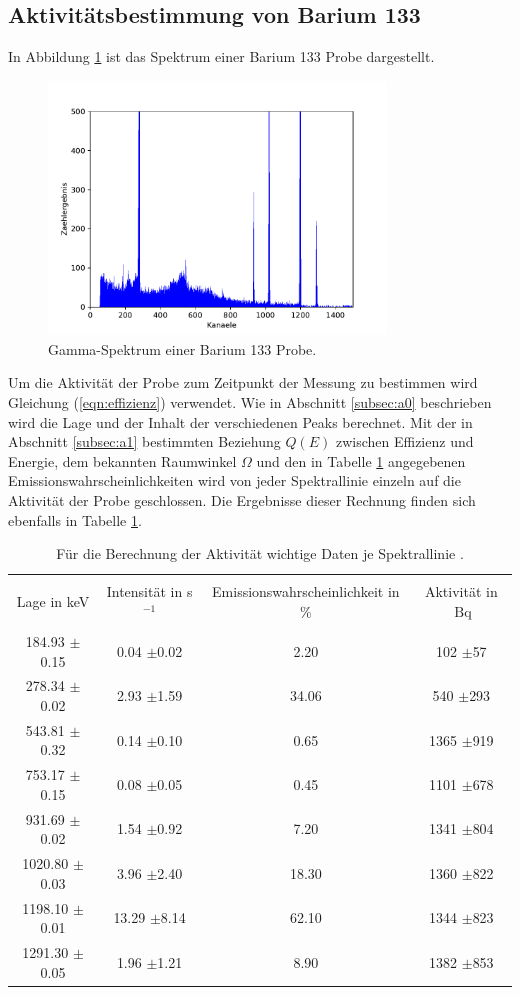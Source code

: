 \subsection{Aktivitätsbestimmung von Barium 133}
\label{subsec:a3}
In Abbildung \ref{fig:Spektrum_Barium} ist das Spektrum einer Barium 133 Probe dargestellt.
\begin{figure}
\centering
\includegraphics[width=0.8\textwidth]{python/plots/spec3.pdf}
\caption{Gamma-Spektrum einer Barium 133 Probe.}
\label{fig:Spektrum_Barium}
\end{figure}
Um die Aktivität der Probe zum Zeitpunkt der Messung zu bestimmen wird Gleichung (\ref{eqn:effizienz}) verwendet.
Wie in Abschnitt \ref{subsec:a0} beschrieben wird die Lage und der Inhalt der verschiedenen Peaks berechnet.
Mit der in Abschnitt \ref{subsec:a1} bestimmten Beziehung $Q(E)$ zwischen Effizienz und Energie, dem bekannten Raumwinkel $\Omega$ und den in Tabelle \ref{tab:a_d_1} angegebenen Emissionswahrscheinlichkeiten wird von jeder Spektrallinie einzeln auf die Aktivität der Probe geschlossen.
Die Ergebnisse dieser Rechnung finden sich ebenfalls in Tabelle \ref{tab:a_d_1}.
\begin{table}
\centering
\caption{Für die Berechnung der Aktivität wichtige Daten je Spektrallinie \cite{sample}.}
\begin{tabular}{c c c c}
\hline \\
Lage in keV & Intensität in s$^{-1}$&  Emissionswahrscheinlichkeit in \%& Aktivität in $\SI{}{\becquerel}$\\
\hline \\
184.93 $\pm$0.15  &  0.04  $\pm$0.02  &  2.20  &  102  $\pm$57 \\ 278.34 $\pm$0.02  &  2.93  $\pm$1.59  &  34.06  &  540  $\pm$293 \\ 543.81 $\pm$0.32  &  0.14  $\pm$0.10  &  0.65  &  1365  $\pm$919 \\ 753.17 $\pm$0.15  &  0.08  $\pm$0.05  &  0.45  &  1101  $\pm$678 \\ 931.69 $\pm$0.02  &  1.54  $\pm$0.92  &  7.20  &  1341  $\pm$804 \\ 1020.80 $\pm$0.03  &  3.96  $\pm$2.40  &  18.30  &  1360  $\pm$822 \\ 1198.10 $\pm$0.01  &  13.29  $\pm$8.14  &  62.10  &  1344  $\pm$823 \\ 1291.30 $\pm$0.05  &  1.96  $\pm$1.21  &  8.90  &  1382  $\pm$853 \\
\hline
\end{tabular}
\label{tab:a_d_1}
\end{table}
